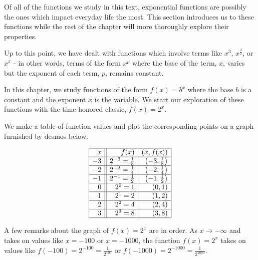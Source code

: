 \documentclass{ximera}
\begin{document}
	\author{Stitz-Zeager}




\setcounter{footnote}{0}

\label{ExponentialFunctions}

Of all of the functions we study in this text, exponential  functions are possibly the ones which impact everyday life the most. This section introduces us to these functions while the rest of the chapter will more thoroughly explore their properties. 

 Up to this point, we have dealt with functions which involve terms like $x^3$,  $x^{\frac{3}{2}}$, or $x^{\pi}$ -  in other words, terms of the form  $x^{p}$ where the base of the term, $x$, varies but the exponent of each term, $p$, remains constant.  
 
 In this chapter, we study functions of the form $f(x) = b^{x}$ where the base $b$ is a constant and the exponent $x$ is the variable.  We start our exploration of these functions with the time-honored classic,  $f(x) = 2^{x}$.  

 
 We make a table of function values and plot the corresponding points on a graph furnished by desmos below.

\[ \begin{array}{|r||r|r|}  \hline
 x & f(x) & (x,f(x)) \\ \hline
-3 & 2^{-3} = \frac{1}{8} & \left(-3, \frac{1}{8} \right) \\ \hline
-2 & 2^{-2} = \frac{1}{4} &  \left(-2, \frac{1}{4} \right) \\ \hline
-1 & 2^{-1} = \frac{1}{2} &  \left(-1, \frac{1}{2} \right) \\  \hline
0  & 2^{0} = 1 & ( 0 ,1) \\  \hline
1  & 2^{1} = 2 & ( 1, 2) \\  \hline
2  & 2^{2} = 4 & (2,4) \\  \hline
3  & 2^{3} = 8 & (3, 8) \\  \hline
\end{array} \] 



\begin{center}
\end{center}

A few remarks about the graph of $f(x) = 2^{x}$ are in order.  As $x \rightarrow -\infty$ and takes on values like $x = -100$ or $x=-1000$, the function $f(x) = 2^{x}$ takes on values like $f(-100) = 2^{-100} = \frac{1}{2^{100}}$ or $f(-1000) = 2^{-1000} = \frac{1}{2^{1000}}$.  
\end{document}

